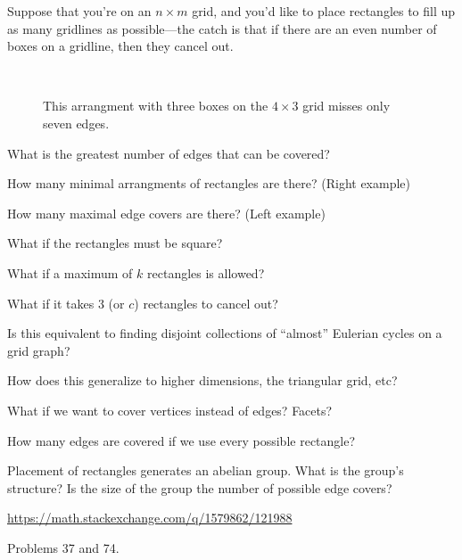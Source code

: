 \documentclass{article}
\begin{document}
Suppose that you're on an $n \times m$ grid, and you'd like to place rectangles
to fill up as many gridlines as possible---the catch is that if there are an
even  number of boxes on a gridline, then they cancel out.

\begin{figure}[ht!]
  \centering
   ~~
  \caption{This arrangment with three boxes on the $4 \times 3$ grid misses
  only seven edges.}
\end{figure}

\begin{question}
  What is the greatest number of edges that can be covered?
\end{question}

\begin{related}
  \item How many minimal arrangments of rectangles are there? (Right example)
  \item How many maximal edge covers are there? (Left example)
  \item What if the rectangles must be square?
  \item What if a maximum of $k$ rectangles is allowed?
  \item What if it takes 3 (or $c$) rectangles to cancel out?
  \item Is this equivalent to finding disjoint collections of ``almost''
    Eulerian cycles on a grid graph?
  \item How does this generalize to higher dimensions, the triangular grid, etc?
  \item What if we want to cover vertices instead of edges? Facets?
  \item How many edges are covered if we use every possible rectangle?
  \item Placement of rectangles generates an abelian group.
    What is the group's structure?
    Is the size of the group the number of possible edge covers?
\end{related}

\begin{references}
  \item \url{https://math.stackexchange.com/q/1579862/121988}
  \item Problems 37 and 74.
\end{references}
\end{document}
